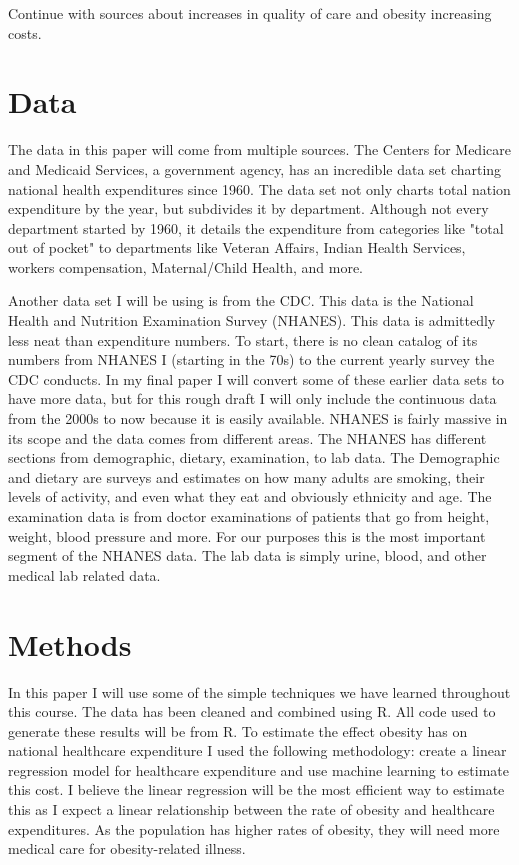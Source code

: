 \documentclass{article}
\begin{document}
Continue with sources about increases in quality of care and obesity increasing costs.


\section{Data}
The data in this paper will come from multiple sources. The Centers for Medicare and Medicaid Services, a government agency, has an incredible data set charting national health expenditures since 1960. The data set not only charts total nation expenditure by the year, but subdivides it by department. Although not every department started by 1960, it details the expenditure from categories like "total out of pocket" to departments like Veteran Affairs, Indian Health Services, workers compensation, Maternal/Child Health, and more.

Another data set I will be using is from the CDC. This data is the National Health and Nutrition Examination Survey (NHANES). This data is admittedly less neat than expenditure numbers. To start, there is no clean catalog of its numbers from NHANES I (starting in the 70s) to the current yearly survey the CDC conducts. In my final paper I will convert some of these earlier data sets to have more data, but for this rough draft I will only include the continuous data from the 2000s to now because it is easily available. NHANES is fairly massive in its scope and the data comes from different areas. The NHANES has different sections from demographic, dietary, examination, to lab data. The Demographic and dietary are surveys and estimates on how many adults are smoking, their levels of activity, and even what they eat and obviously ethnicity and age. The examination data is from doctor examinations of patients that go from height, weight, blood pressure and more. For our purposes this is the most important segment of the NHANES data. The lab data is simply urine, blood, and other medical lab related data. 
\section{Methods}

In this paper I will use some of the simple techniques we have learned throughout this course. The data has been cleaned and combined using R. All code used to generate these results will be from R. To estimate the effect obesity has on national healthcare expenditure I used the following methodology: create a linear regression model for healthcare expenditure and use machine learning to estimate this cost. I believe the linear regression will be the most efficient way to estimate this as I expect a linear relationship between the rate of obesity and healthcare expenditures. As the population has higher rates of obesity, they will need more medical care for obesity-related illness.
\end{document}
